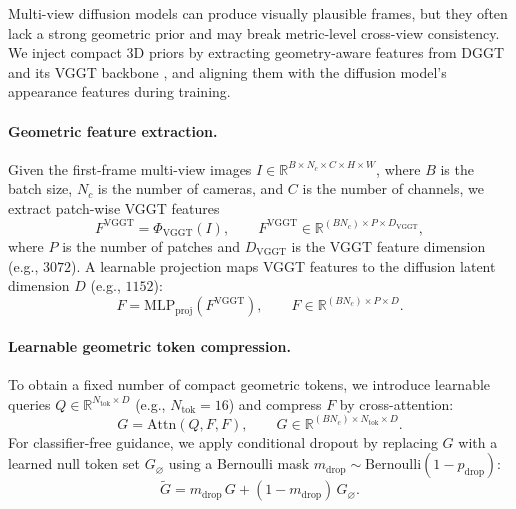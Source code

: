 \documentclass{article}
\begin{document}
Multi-view diffusion models can produce visually plausible frames, but they often lack a strong geometric prior and may break metric-level cross-view consistency. We inject compact 3D priors by extracting geometry-aware features from DGGT and its VGGT backbone \cite{chen2025dggt,wang2025vggt}, and aligning them with the diffusion model's appearance features during training.

\paragraph{Geometric feature extraction.}
Given the first-frame multi-view images
$ I \in \mathbb{R}^{B \times N_c \times C \times H \times W}$,
where $B$ is the batch size, $N_c$ is the number of cameras, and $C$ is the number of channels,
we extract patch-wise VGGT features
\begin{equation}
F^{\mathrm{VGGT}} = \Phi_{\mathrm{VGGT}}(I),
\qquad
F^{\mathrm{VGGT}} \in \mathbb{R}^{(B N_c) \times P \times D_{\mathrm{VGGT}}},
\label{eq:vggt_feat}
\end{equation}
where $P$ is the number of patches and $D_{\mathrm{VGGT}}$ is the VGGT feature dimension (e.g., $3072$).
A learnable projection maps VGGT features to the diffusion latent dimension $D$ (e.g., $1152$):
\begin{equation}
F = \mathrm{MLP}_{\mathrm{proj}}(F^{\mathrm{VGGT}}),
\qquad
F \in \mathbb{R}^{(B N_c) \times P \times D}.
\label{eq:vggt_proj}
\end{equation}

\paragraph{Learnable geometric token compression.}
To obtain a fixed number of compact geometric tokens, we introduce learnable queries
$Q \in \mathbb{R}^{N_{\mathrm{tok}} \times D}$ (e.g., $N_{\mathrm{tok}}{=}16$) and compress $F$ by cross-attention:
\begin{equation}
G = \mathrm{Attn}(Q, F, F),
\qquad
G \in \mathbb{R}^{(B N_c) \times N_{\mathrm{tok}} \times D}.
\label{eq:geo_token}
\end{equation}
For classifier-free guidance, we apply conditional dropout by replacing $G$ with a learned null token set
$G_{\varnothing}$ using a Bernoulli mask $m_{\mathrm{drop}} \sim \mathrm{Bernoulli}(1-p_{\mathrm{drop}})$:
\begin{equation}
\tilde{G} = m_{\mathrm{drop}} \, G + (1-m_{\mathrm{drop}})\, G_{\varnothing}.
\label{eq:geo_token_dropout}
\end{equation}
\end{document}
